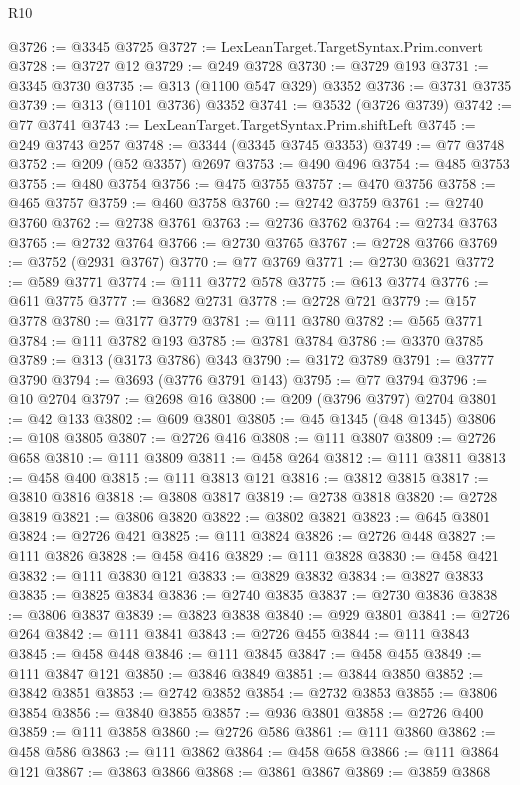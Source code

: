 \begin{lexlean}{R10}
\begin{coremodule}
{{{{{{{{{{{{{{{{{{{{{{{{{{{{{{{{{{{{{{{{{{{{{{{{{{{{{{{{{{{{{{{{{{{{{{{{{{{{{{{{{{{{{{{{{{{{{{{{{{{{{{{{{{{{@3726 := @3345 @3725
@3727 := LexLeanTarget.TargetSyntax.Prim.convert
@3728 := @3727 @12
@3729 := @249 @3728
@3730 := @3729 @193
@3731 := @3345 @3730
@3735 := @313 (@1100 @547 @329) @3352
@3736 := @3731 @3735
@3739 := @313 (@1101 @3736) @3352
@3741 := @3532 (@3726 @3739)
@3742 := @77 @3741
@3743 := LexLeanTarget.TargetSyntax.Prim.shiftLeft
@3745 := @249 @3743 @257
@3748 := @3344 (@3345 @3745 @3353)
@3749 := @77 @3748
@3752 := @209 (@52 @3357) @2697
@3753 := @490 @496
@3754 := @485 @3753
@3755 := @480 @3754
@3756 := @475 @3755
@3757 := @470 @3756
@3758 := @465 @3757
@3759 := @460 @3758
@3760 := @2742 @3759
@3761 := @2740 @3760
@3762 := @2738 @3761
@3763 := @2736 @3762
@3764 := @2734 @3763
@3765 := @2732 @3764
@3766 := @2730 @3765
@3767 := @2728 @3766
@3769 := @3752 (@2931 @3767)
@3770 := @77 @3769
@3771 := @2730 @3621
@3772 := @589 @3771
@3774 := @111 @3772 @578
@3775 := @613 @3774
@3776 := @611 @3775
@3777 := @3682 @2731
@3778 := @2728 @721
@3779 := @157 @3778
@3780 := @3177 @3779
@3781 := @111 @3780
@3782 := @565 @3771
@3784 := @111 @3782 @193
@3785 := @3781 @3784
@3786 := @3370 @3785
@3789 := @313 (@3173 @3786) @343
@3790 := @3172 @3789
@3791 := @3777 @3790
@3794 := @3693 (@3776 @3791 @143)
@3795 := @77 @3794
@3796 := @10 @2704
@3797 := @2698 @16
@3800 := @209 (@3796 @3797) @2704
@3801 := @42 @133
@3802 := @609 @3801
@3805 := @45 @1345 (@48 @1345)
@3806 := @108 @3805
@3807 := @2726 @416
@3808 := @111 @3807
@3809 := @2726 @658
@3810 := @111 @3809
@3811 := @458 @264
@3812 := @111 @3811
@3813 := @458 @400
@3815 := @111 @3813 @121
@3816 := @3812 @3815
@3817 := @3810 @3816
@3818 := @3808 @3817
@3819 := @2738 @3818
@3820 := @2728 @3819
@3821 := @3806 @3820
@3822 := @3802 @3821
@3823 := @645 @3801
@3824 := @2726 @421
@3825 := @111 @3824
@3826 := @2726 @448
@3827 := @111 @3826
@3828 := @458 @416
@3829 := @111 @3828
@3830 := @458 @421
@3832 := @111 @3830 @121
@3833 := @3829 @3832
@3834 := @3827 @3833
@3835 := @3825 @3834
@3836 := @2740 @3835
@3837 := @2730 @3836
@3838 := @3806 @3837
@3839 := @3823 @3838
@3840 := @929 @3801
@3841 := @2726 @264
@3842 := @111 @3841
@3843 := @2726 @455
@3844 := @111 @3843
@3845 := @458 @448
@3846 := @111 @3845
@3847 := @458 @455
@3849 := @111 @3847 @121
@3850 := @3846 @3849
@3851 := @3844 @3850
@3852 := @3842 @3851
@3853 := @2742 @3852
@3854 := @2732 @3853
@3855 := @3806 @3854
@3856 := @3840 @3855
@3857 := @936 @3801
@3858 := @2726 @400
@3859 := @111 @3858
@3860 := @2726 @586
@3861 := @111 @3860
@3862 := @458 @586
@3863 := @111 @3862
@3864 := @458 @658
@3866 := @111 @3864 @121
@3867 := @3863 @3866
@3868 := @3861 @3867
@3869 := @3859 @3868
}}}}}}}}}}}}}}}}}}}}}}}}}}}}}}}}}}}}}}}}}}}}}}}}}}}}}}}}}}}}}}}}}}}}}}}}}}}}}}}}}}}}}}}}}}}}}}}}}}}}}}}}}}}}
\end{coremodule}
\end{lexlean}
